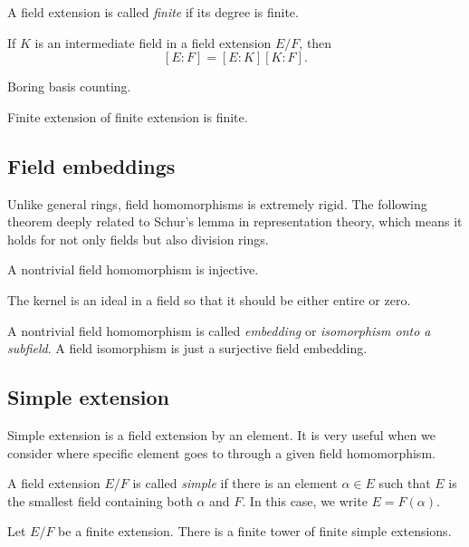 \documentclass{../exp}
\begin{document}
\begin{defn}
A field extension is called \emph{finite} if its degree is finite.
\end{defn}

\begin{thm}
If $K$ is an intermediate field in a field extension $E/F$, then
\[[E:F]=[E:K][K:F].\]
\end{thm}
\begin{pf}
Boring basis counting.
\end{pf}

\begin{cor}
Finite extension of finite extension is finite.
\end{cor}




\subsection{Field embeddings}

Unlike general rings, field homomorphisms is extremely rigid.
The following theorem deeply related to Schur's lemma in representation theory, which means it holds for not only fields but also division rings.

\begin{prop}
A nontrivial field homomorphism is injective.
\end{prop}
\begin{pf}
The kernel is an ideal in a field so that it should be either entire or zero.
\end{pf}
A nontrivial field homomorphism is called \emph{embedding} or \emph{isomorphism onto a subfield}.
A field isomorphism is just a surjective field embedding.



\subsection{Simple extension}
Simple extension is a field extension by an element.
It is very useful when we consider where specific element goes to through a given field homomorphism.

\begin{defn}
A field extension $E/F$ is called \emph{simple} if there is an element $\alpha\in E$ such that $E$ is the smallest field containing both $\alpha$ and $F$.
In this case, we write $E=F(\alpha)$.
\end{defn}

\begin{lem}
Let $E/F$ be a finite extension.
There is a finite tower of finite simple extensions.
\end{lem}
\end{document}
